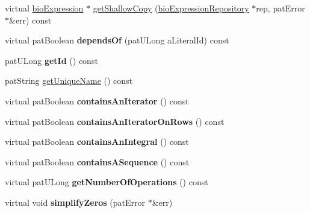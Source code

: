 \begin{DoxyCompactItemize}
\item 
virtual \hyperlink{classbio_expression}{bio\+Expression} $\ast$ \hyperlink{classbio_expression_a442534762693b92baaf33928979a1bf8}{get\+Shallow\+Copy} (\hyperlink{classbio_expression_repository}{bio\+Expression\+Repository} $\ast$rep, pat\+Error $\ast$\&err) const
\item 
\mbox{\label{classbio_expression_aa036b5aa081bd3320fa439de36d4657e}} 
virtual pat\+Boolean {\bfseries depends\+Of} (pat\+U\+Long a\+Literal\+Id) const
\item 
\mbox{\label{classbio_expression_afaf07cbfb3fdd2d9f004de109c24d642}} 
pat\+U\+Long {\bfseries get\+Id} () const
\item 
pat\+String \hyperlink{classbio_expression_aa19617e73907e73780d148c5ce5e6ee5}{get\+Unique\+Name} () const
\item 
\mbox{\label{classbio_expression_a68bd85731f5311c893708a75794b3970}} 
virtual pat\+Boolean {\bfseries contains\+An\+Iterator} () const
\item 
\mbox{\label{classbio_expression_a4109c43e28a0d82fa655f448b301a472}} 
virtual pat\+Boolean {\bfseries contains\+An\+Iterator\+On\+Rows} () const
\item 
\mbox{\label{classbio_expression_a3899893095cb89dce8ef3f2ff516fdaa}} 
virtual pat\+Boolean {\bfseries contains\+An\+Integral} () const
\item 
\mbox{\label{classbio_expression_acc34026ff0b26a9f787056b14e7b73ba}} 
virtual pat\+Boolean {\bfseries contains\+A\+Sequence} () const
\item 
\mbox{\label{classbio_expression_a39780130d95d0422982cda287a5bb332}} 
virtual pat\+U\+Long {\bfseries get\+Number\+Of\+Operations} () const
\item 
\mbox{\label{classbio_expression_aa35438b632e34185942f24ce5021c476}} 
virtual void {\bfseries simplify\+Zeros} (pat\+Error $\ast$\&err)
\item 
\mbox{\label{classbio_expression_a4f993b7df57c7dc2376342e1b2535fcc}} 

\end{DoxyCompactItemize}
